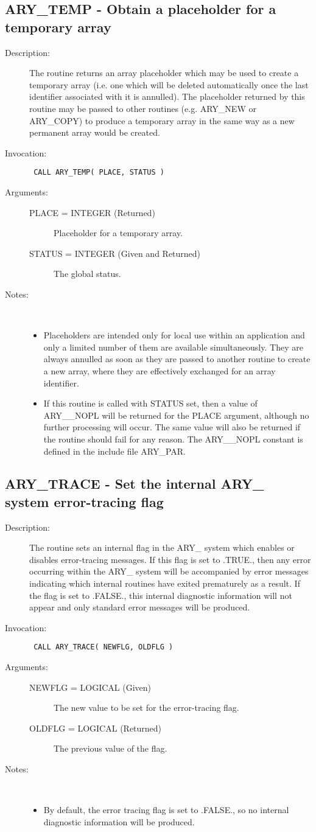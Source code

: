 \documentclass[twoside,11pt]{article}
\newcommand{\xlabel}[1]{}
\newlength{\sstbannerlength}
\newlength{\sstcaptionlength}
\newlength{\sstexampleslength}
\newlength{\sstexampleswidth}
\newcommand{\sstroutine}[3]{
   \goodbreak
   \rule{\textwidth}{0.5mm}
   \vspace{-7ex}
   \newline
   \settowidth{\sstbannerlength}{{\Large {\bf #1}}}
   \setlength{\sstcaptionlength}{\textwidth}
   \setlength{\sstexampleslength}{\textwidth}
   \addtolength{\sstbannerlength}{0.5em}
   \addtolength{\sstcaptionlength}{-2.0\sstbannerlength}
   \addtolength{\sstcaptionlength}{-5.0pt}
   \settowidth{\sstexampleswidth}{{\bf Examples:}}
   \addtolength{\sstexampleslength}{-\sstexampleswidth}
   \parbox[t]{\sstbannerlength}{\flushleft{\Large {\bf #1}}}
   \parbox[t]{\sstcaptionlength}{\center{\Large #2}}
   \parbox[t]{\sstbannerlength}{\flushright{\Large {\bf #1}}}
   \begin{description}
      #3
   \end{description}
}
\newcommand{\sstdescription}[1]{\item[Description:] #1}
\newcommand{\sstinvocation}[1]{\item[Invocation:]\hspace{0.4em}{\tt #1}}
\newcommand{\sstarguments}[1]{
   \item[Arguments:] \mbox{} \\
   \vspace{-3.5ex}
   \begin{description}
      #1
   \end{description}
}
\newcommand{\sstsubsection}[1]{ \item[{#1}] \mbox{} \\}
\newcommand{\sstnotes}[1]{\item[Notes:] \mbox{} \\[1.3ex] #1}
\newcommand{\sstitemlist}[1]{
  \mbox{} \\
  \vspace{-3.5ex}
  \begin{itemize}
     #1
  \end{itemize}
}
\newcommand{\sstitem}{\item}
\newcommand{\ssttt}{\tt}
\renewcommand{\sstroutine}[3]{
      \subsection{#1\xlabel{#1}-\label{#1}#2}
      \begin{description}
         #3
      \end{description}
   }
\renewcommand{\sstdescription}[1]{\item[Description:]
      \begin{description}
         #1
      \end{description}
   }
\renewcommand{\sstinvocation}[1]{\item[Invocation:]
      \begin{description}
         {\ssttt #1}
      \end{description}
   }
\renewcommand{\sstarguments}[1]{
      \item[Arguments:]
      \begin{description}
         #1
      \end{description}
   }
\renewcommand{\sstsubsection}[1]{\item[{#1}]}
\renewcommand{\sstnotes}[1]{\item[Notes:]
      \begin{description}
         #1
      \end{description}
   }
\newcommand{\sstitemlist}[1]{
      \begin{itemize}
         #1
      \end{itemize}
   }
\begin{document}
\sstroutine{
   ARY\_TEMP
}{
   Obtain a placeholder for a temporary array
}{
   \sstdescription{
      The routine returns an array placeholder which may be used to
      create a temporary array (i.e. one which will be deleted
      automatically once the last identifier associated with it is
      annulled). The placeholder returned by this routine may be passed
      to other routines (e.g. ARY\_NEW or ARY\_COPY) to produce a
      temporary array in the same way as a new permanent array would be
      created.
   }
   \sstinvocation{
      CALL ARY\_TEMP( PLACE, STATUS )
   }
   \sstarguments{
      \sstsubsection{
         PLACE = INTEGER (Returned)
      }{
         Placeholder for a temporary array.
      }
      \sstsubsection{
         STATUS = INTEGER (Given and Returned)
      }{
         The global status.
      }
   }
   \sstnotes{
      \sstitemlist{

         \sstitem
         Placeholders are intended only for local use within an
         application and only a limited number of them are available
         simultaneously. They are always annulled as soon as they are
         passed to another routine to create a new array, where they are
         effectively exchanged for an array identifier.

         \sstitem
         If this routine is called with STATUS set, then a value of
         ARY\_\_NOPL will be returned for the PLACE argument, although no
         further processing will occur. The same value will also be
         returned if the routine should fail for any reason. The ARY\_\_NOPL
         constant is defined in the include file ARY\_PAR.
      }
   }
}
\sstroutine{
   ARY\_TRACE
}{
   Set the internal ARY\_ system error-tracing flag
}{
   \sstdescription{
      The routine sets an internal flag in the ARY\_ system which
      enables or disables error-tracing messages. If this flag is set
      to .TRUE., then any error occurring within the ARY\_ system will
      be accompanied by error messages indicating which internal
      routines have exited prematurely as a result. If the flag is set
      to .FALSE., this internal diagnostic information will not appear
      and only standard error messages will be produced.
   }
   \sstinvocation{
      CALL ARY\_TRACE( NEWFLG, OLDFLG )
   }
   \sstarguments{
      \sstsubsection{
         NEWFLG = LOGICAL (Given)
      }{
         The new value to be set for the error-tracing flag.
      }
      \sstsubsection{
         OLDFLG = LOGICAL (Returned)
      }{
         The previous value of the flag.
      }
   }
   \sstnotes{
      \sstitemlist{

         \sstitem
         By default, the error tracing flag is set to .FALSE., so
         no internal diagnostic information will be produced.
      }
   }
}
\end{document}
